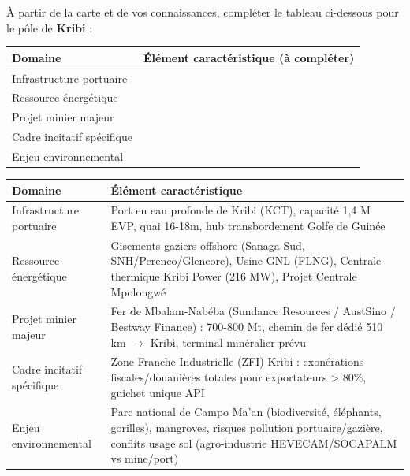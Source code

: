 \documentclass[11pt]{article}
\begin{document}
\begin{exercice}
À partir de la carte et de vos connaissances, compléter le tableau ci-dessous pour le pôle de \textbf{Kribi} :
\begin{center}
\begin{tabularx}{\linewidth}{|l|X|}
\hline
\textbf{Domaine} & \textbf{Élément caractéristique (à compléter)} \\ \hline
Infrastructure portuaire & \\ \hline
Ressource énergétique & \\ \hline
Projet minier majeur & \\ \hline
Cadre incitatif spécifique & \\ \hline
Enjeu environnemental & \\ \hline
\end{tabularx}
\end{center}
\end{exercice}

\begin{corrige}
\begin{center}
\begin{tabularx}{\linewidth}{|l|X|}
\hline
\textbf{Domaine} & \textbf{Élément caractéristique} \\ \hline
Infrastructure portuaire & Port en eau profonde de Kribi (KCT), capacité 1,4 M EVP, quai 16-18m, hub transbordement Golfe de Guinée \\ \hline
Ressource énergétique & Gisements gaziers offshore (Sanaga Sud, SNH/Perenco/Glencore), Usine GNL (FLNG), Centrale thermique Kribi Power (216 MW), Projet Centrale Mpolongwé \\ \hline
Projet minier majeur & Fer de Mbalam-Nabéba (Sundance Resources / AustSino / Bestway Finance) : 700-800 Mt, chemin de fer dédié 510 km $\to$ Kribi, terminal minéralier prévu \\ \hline
Cadre incitatif spécifique & Zone Franche Industrielle (ZFI) Kribi : exonérations fiscales/douanières totales pour exportateurs > 80\%, guichet unique API \\ \hline
Enjeu environnemental & Parc national de Campo Ma'an (biodiversité, éléphants, gorilles), mangroves, risques pollution portuaire/gazière, conflits usage sol (agro-industrie HEVECAM/SOCAPALM vs mine/port) \\ \hline
\end{tabularx}
\end{center}
\end{corrige}
\end{document}
